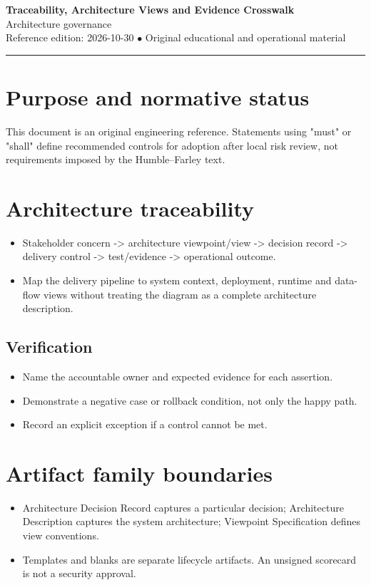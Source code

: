 \documentclass[10pt,letterpaper]{article}
\begin{document}
\begin{center}
{\LARGE\bfseries\color{cdblue}Traceability, Architecture Views and Evidence Crosswalk}\\[7pt]
{\large Architecture governance}\\[6pt]
{\small Reference edition: 2026-10-30 $\bullet$ Original educational and operational material}
\end{center}
\noindent\color{cdblue}\rule{\linewidth}{1.2pt}\color{black}
\vspace{0.4em}
\section{Purpose and normative status}
This document is an original engineering reference. Statements using "must" or "shall" define recommended controls for adoption after local risk review, not requirements imposed by the Humble--Farley text.


\section{Architecture traceability}
\begin{itemize}
\item Stakeholder concern -> architecture viewpoint/view -> decision record -> delivery control -> test/evidence -> operational outcome.
\item Map the delivery pipeline to system context, deployment, runtime and data-flow views without treating the diagram as a complete architecture description.
\end{itemize}
\subsection{Verification}
\begin{itemize}
\item Name the accountable owner and expected evidence for each assertion.
\item Demonstrate a negative case or rollback condition, not only the happy path.
\item Record an explicit exception if a control cannot be met.
\end{itemize}


\section{Artifact family boundaries}
\begin{itemize}
\item Architecture Decision Record captures a particular decision; Architecture Description captures the system architecture; Viewpoint Specification defines view conventions.
\item Templates and blanks are separate lifecycle artifacts. An unsigned scorecard is not a security approval.
\end{itemize}
\end{document}
